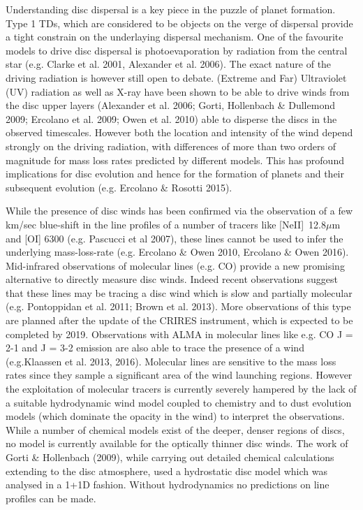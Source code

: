 Understanding disc dispersal is a key piece in the puzzle of planet
formation. Type 1 TDs, which are considered to be objects on the
verge of dispersal provide a tight constrain on the underlaying
dispersal mechanism. One of the favourite models to drive disc
dispersal is photoevaporation by radiation from the central star
(e.g. Clarke et al. 2001, Alexander et al. 2006). The exact nature of
the driving radiation is however still open to debate.  (Extreme and
Far) Ultraviolet (UV) radiation as well as X-ray have been shown to be
able to drive winds from the disc upper layers (Alexander et al. 2006;
Gorti, Hollenbach \& Dullemond 2009; Ercolano et al. 2009; Owen et
al. 2010) able to disperse the discs in the observed
timescales. However both the location and intensity of the wind depend
strongly on the driving radiation, with differences of more than two
orders of magnitude for mass loss rates predicted by different
models. This has profound implications for disc evolution and hence
for the formation of planets and their subsequent evolution
(e.g. Ercolano \& Rosotti 2015). 

While the presence of disc winds has been confirmed via the
observation of a few km/sec blue-shift in the line profiles of a
number of tracers like [NeII]~12.8$\mu$m and [OI] 6300 (e.g. Pascucci
et al 2007), these lines cannot be used to infer the underlying
mass-loss-rate (e.g. Ercolano \& Owen 2010, Ercolano \& Owen 2016).
Mid-infrared observations of molecular lines (e.g. CO) provide a new
promising alternative to directly measure disc winds. Indeed recent
observations suggest that these lines may be tracing a disc wind which
is slow and partially molecular (e.g. Pontoppidan et al. 2011; Brown et al. 2013). 
More observations of this type are planned after the update of
the CRIRES instrument, which is expected to be completed by
2019. Observations with ALMA in molecular lines like e.g. CO J = 2-1
and J = 3-2 emission are also able to trace the presence of a wind (e.g.Klaassen et al. 2013, 2016).  
Molecular lines are sensitive to the mass loss rates since they
sample a significant area of the wind launching regions. However the
exploitation of molecular tracers is currently severely hampered by
the lack of a suitable hydrodynamic wind model coupled to chemistry
and to dust evolution models (which dominate the opacity in the wind)
to interpret the observations. While a number of chemical models exist
of the deeper, denser regions of discs, no model is currently
available for the optically thinner disc winds. The work of Gorti \&
Hollenbach (2009), while carrying out detailed chemical calculations
extending to the disc atmosphere, used a hydrostatic disc model which
was analysed in a 1+1D fashion. Without hydrodynamics no predictions
on line profiles can be made.  

